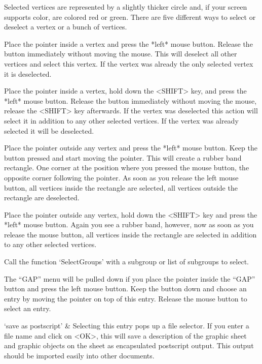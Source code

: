 
Selected vertices are  represented by a slightly  thicker circle and,  if
your screen  supports color, are colored red   or green.  There  are five
different ways to select or deselect a vertex or a bunch of vertices.

Place the  pointer inside  a  vertex and press   the *left* mouse button.
Release   the button immediately   without  moving the  mouse.  This will
deselect all other vertices  and select this vertex.   If the vertex  was
already the only selected vertex it is deselected.

Place the  pointer inside a vertex, hold  down the <SHIFT> key, and press
the  *left* mouse button.   Release the button immediately without moving
the    mouse, release the   <SHIFT> key  afterwards.   If  the vertex was
deselected this action will  select it in  addition to any other selected
vertices. If the vertex was already selected it will be deselected.

Place the pointer  outside any vertex  and press the *left* mouse button.
Keep the button pressed and start moving the pointer.  This will create a
rubber band rectangle.  One corner at the position  where you pressed the
mouse button, the opposite corner following  the pointer.  As soon as you
release the left mouse button,   all  vertices inside the rectangle   are
selected, all vertices outside the rectangle are deselected.

Place the pointer outside any vertex, hold down the <SHIFT> key and press
the *left*  mouse button.  Again  you see a rubber  band, however, now as
soon as you release  the mouse button,  all vertices inside the rectangle
are selected in addition to any other selected vertices.

Call the function `SelectGroups' with a subgroup or list of subgroups to
select.


The ``GAP'' menu will  be pulled down if  you place the pointer inside  the
``GAP'' button  and press the left mouse  button.  Keep the button down and
choose an entry by moving the pointer on  top of this entry.  Release the
mouse button to select an entry.

\beginitems
`save as postscript' &
Selecting this entry pops up a file  selector.  If you  enter a file name
and click on <OK>, this will save a  description of the graphic sheet and
graphic objects on  the sheet as encapsulated postscript  output. This
output should be imported easily into other documents.

